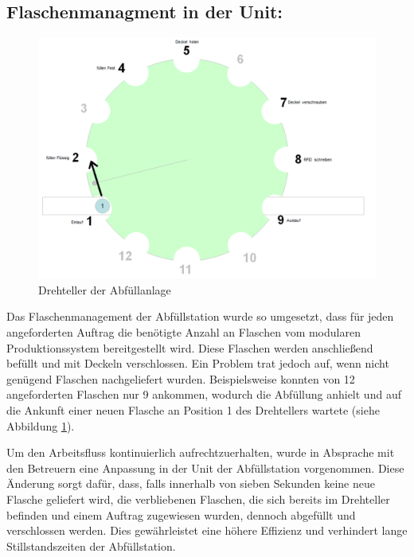 \subsection{Flaschenmanagment in der Unit:}     

\begin{figure}[h!]
    \centering
    \includegraphics{figures/image.png}
    \caption{Drehteller der Abfüllanlage\cite{siemens2022}} %
    \label{Drehteller} %
\end{figure}

Das Flaschenmanagement der Abfüllstation wurde so umgesetzt, dass für jeden angeforderten Auftrag die benötigte Anzahl an Flaschen vom modularen 
Produktionssystem bereitgestellt wird. Diese Flaschen werden anschließend befüllt und mit Deckeln verschlossen. Ein Problem trat jedoch auf, wenn 
nicht genügend Flaschen nachgeliefert wurden. Beispielsweise konnten von 12 angeforderten Flaschen nur 9 ankommen, wodurch die Abfüllung anhielt 
und auf die Ankunft einer neuen Flasche an Position 1 des Drehtellers wartete (siehe Abbildung \ref{Drehteller}).

Um den Arbeitsfluss kontinuierlich aufrechtzuerhalten, wurde in Absprache mit den Betreuern eine Anpassung in der Unit der Abfüllstation 
vorgenommen. Diese Änderung sorgt dafür, dass, falls innerhalb von sieben Sekunden keine neue Flasche geliefert wird, die verbliebenen Flaschen, 
die sich bereits im Drehteller befinden und einem Auftrag zugewiesen wurden, dennoch abgefüllt und verschlossen werden. Dies gewährleistet eine 
höhere Effizienz und verhindert lange Stillstandszeiten der Abfüllstation.

